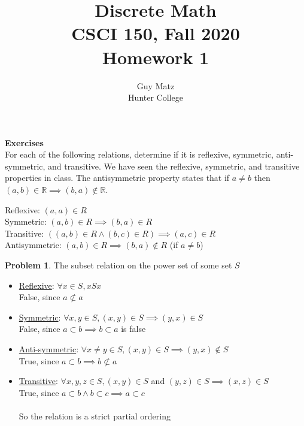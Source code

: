 \documentclass[10pt,leqno ]{article}
\title{Discrete Math\\
CSCI 150, Fall 2020\\
Homework 1}
\author{Guy Matz \\
Hunter College}
\theoremstyle{definition}
\newtheorem{problem}[theorem]{Problem}
\begin{document}
\textbf{Exercises}\\
For each of the following relations, determine if it is reflexive, symmetric, anti-symmetric, and transitive.  We have seen the reflexive, symmetric, and transitive properties in class.  The antisymmetric property states that if $a \neq b$ then $(a, b) \in \mathbb{R} \implies (b, a) \notin \mathbb{R}$.

\begin{center}
Reflexive: $(a,a) \in R$\\
Symmetric: $(a,b) \in R  \implies (b, a) \in R$\\
Transitive: $((a, b) \in R \wedge (b, c) \in R) \implies (a,c) \in R$\\
Antisymmetric: $(a,b) \in R \implies (b, a) \notin R$ (if $a\neq b$)\\
\end{center}
\begin{problem} The subset relation on the power set of some set $S$
\Large
\begin{itemize}
\item \underline{Reflexive}: $\forall x \in S, x S x$\\
False, since $a \not\subset a$
\item \underline{Symmetric}: $\forall x, y \in S, (x, y) \in S \implies (y, x) \in S$\\
False, since $a \subset b \implies b \subset a$ is false
\item \underline{Anti-symmetric}: $\forall x \neq y \in S, (x, y) \in S \implies (y, x) \notin S$\\
True, since $a \subset b \implies b \not\subset a$
\item \underline{Transitive}: $\forall x,y,z \in S, (x, y) \in S$ and $(y, z) \in S \implies (x, z) \in S$ \\
True, since $a \subset b \wedge b \subset c \implies a \subset c$
\\\\
So the relation is a strict partial ordering
\end{itemize}

\end{problem}
\newpage
\end{document}
